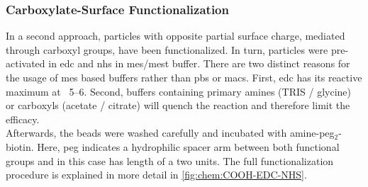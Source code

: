 \begin{table}[!h]
	\hfill
	\label{tab:biotinyl:fitParams}
\end{table}
\clearpage

\subsubsection{Carboxylate-Surface Functionalization}
In a second approach, particles with opposite partial surface charge, mediated through \gls{carboxyl} groups, have been functionalized. In turn, particles were pre-activated in \gls{edc} and \gls{nhs} in \gls{mes}/\gls{mest} buffer. There are two distinct reasons for the usage of \gls{mes} based buffers rather than \gls{pbs} or \gls{macs}. First, \gls{edc} has its reactive maximum at \pH\ \numrange{5}{6}. Second, buffers containing primary \glspl{amine} (TRIS / glycine) or \glspl{carboxyl} (acetate / citrate) will quench the reaction and therefore limit the efficacy.\\
Afterwards, the beads were washed carefully and incubated with \gls{amine}-\acrshort{peg}$_2$-biotin. Here, \gls{peg} indicates a hydrophilic spacer arm between both functional groups and in this case has length of a two units. The full functionalization procedure is explained in more detail in \cref{fig:chem:COOH-EDC-NHS}. 

